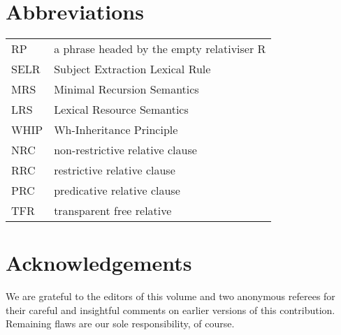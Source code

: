 \documentclass[output=paper
                ,modfonts
                ,nonflat
	        ,collection
	        ,collectionchapter
	        ,collectiontoclongg
 	        ,biblatex
                ,babelshorthands
                ,newtxmath
                ,draftmode
                ,colorlinks, citecolor=brown
]{./langsci/langscibook}
\begin{document}

\section*{Abbreviations}

\begin{tabularx}{.99\textwidth}{@{}lX}
RP & a phrase headed by the empty relativiser R\\
SELR & Subject Extraction Lexical Rule         \\            
MRS & Minimal Recursion Semantics              \\            
LRS & Lexical Resource Semantics               \\            
WHIP &  Wh-Inheritance Principle                \\             
NRC & non-restrictive relative clause           \\             
RRC & restrictive relative clause               \\             
PRC & predicative relative clause               \\             
TFR & transparent free relative                 \\             
\end{tabularx}





\section*{Acknowledgements}
We are grateful to the editors of this volume and two anonymous referees for their careful
and insightful comments on earlier versions of this contribution. Remaining flaws are our
sole responsibility, of course.


{\sloppy 
\printbibliography[heading=subbibliography,notkeyword=this] 
}
\end{document}

